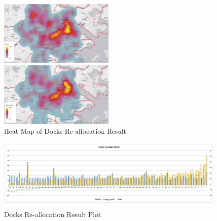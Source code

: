 \documentclass[journal, letterpaper]{IEEEtran}
\begin{document}
\begin{figure}
  \includegraphics[width=0.5\textwidth]{docksheat.jpg}
  
  \vspace{0.5cm}
  \includegraphics[width=0.5\textwidth]{assigndocksheat.jpg}
  \caption{Heat Map of Docks Re-allocation Result}
  \captionsetup{justification=centering}
  \label{fig:4}
\end{figure}



\begin{figure}
  \includegraphics[width=1\textwidth]{dockvsassigndock.jpg}
  \caption{Docks Re-allocation Result Plot}
  \label{fig:5}
\end{figure}
\end{document}
